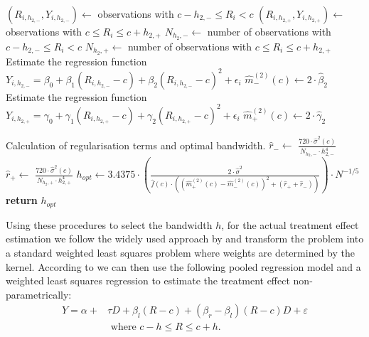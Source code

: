 \begin{algorithm}
\begin{algorithmic}[1]
		\State $(R_{i, h_{2, -}}, Y_{i, h_{2, -}}) \gets$ observations with $c-h_{2, -} \leq R_{i} < c$
		\State $(R_{i, h_{2, +}}, Y_{i, h_{2, +}}) \gets$ observations with $c \leq R_{i} \leq c+h_{2, +}$
		\State $N_{h_{2}, -} \gets$ number of observations with $c-h_{2, -} \leq R_{i} < c$
		\State $N_{h_{2}, +} \gets$ number of observations with $c \leq R_{i} \leq c+h_{2, +}$
		\State Estimate the regression function  $Y_{i, h_{2,-}} = \beta_{0} + \beta_{1} (R_{i, h_{2, -}}-c) + \beta_{2} (R_{i, h_{2, -}}-c)^{2} + \epsilon_{i}$
		\State $\widehat{m}^{(2)}_{-}(c) \gets 2 \cdot \widehat{\beta}_{2}$ {\color{blue} }
		\State Estimate the regression function  $Y_{i, h_{2,+}} = \gamma_{0} + \gamma_{1} (R_{i, h_{2, +}}-c) + \gamma_{2} (R_{i, h_{2, +}}-c)^{2} + \epsilon_{i}$
		\State $\widehat{m}^{(2)}_{+}(c) \gets 2 \cdot \widehat{\gamma}_{2}$ {\color{blue} }

		\Stepthree Calculation of regularisation terms and optimal bandwidth.
		\State $\widehat{r}_{-} \gets$ $\frac{720 \cdot \widehat{\sigma}^{2}(c)}{N_{h_{2}, -} \cdot h_{2, -}^{4}}$
		\State $\widehat{r}_{+} \gets$ $\frac{720 \cdot \widehat{\sigma}^{2}(c)}{N_{h_{2}, +} \cdot h_{2, +}^{4}}$
		\State $h_{opt} \gets 3.4375 \cdot \left(\frac{2 \cdot \widehat{\sigma}^{2}}{\widehat{f}(c) \cdot \left( \left( \widehat{m}^{(2)}_{+}(c) - \widehat{m}^{(2)}_{-}(c) \right)^{2} + \left( \widehat{r}_{+} + \widehat{r}_{-} \right) \right)}\right) \cdot N^{-1/5}$
		\State \textbf{return} $h_{opt}$
	\end{algorithmic}
\end{algorithm}

Using these procedures to select the bandwidth $h$, for the actual treatment effect estimation we follow the widely used approach by \cite{fan_gij} and transform the problem into a standard weighted least squares problem where weights are determined by the kernel. According to \cite{lee_lemieux} we can then use the following pooled regression model and a weighted least squares regression to estimate the treatment effect non-parametrically:
\begin{align}
Y = \alpha + & \tau D + \beta_{l} (R-c) + (\beta_{r} - \beta_{l}) (R-c) D + \varepsilon \\
&\text{ where } c - h \leq R \leq c + h. \nonumber
\label{eq: model_non_param}
\end{align}


